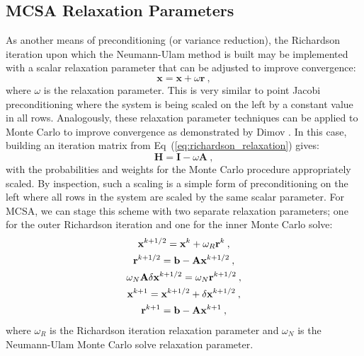 \clearpage

\subsection{MCSA Relaxation Parameters}
\label{subsec:spn_mcsa_relaxation}
As another means of preconditioning (or variance reduction), the
Richardson iteration upon which the Neumann-Ulam method is built may
be implemented with a scalar relaxation parameter that can be adjusted
to improve convergence:
\begin{equation}
  \mathbf{x} = \mathbf{x} + \omega \mathbf{r}\:,
  \label{eq:richardson_relaxation}
\end{equation}
where $\omega$ is the relaxation parameter. This is very similar to
point Jacobi preconditioning where the system is being scaled on the
left by a constant value in all rows. Analogously, these relaxation
parameter techniques can be applied to Monte Carlo to improve
convergence as demonstrated by Dimov \cite{dimov_new_1998}. In this
case, building an iteration matrix from
Eq~(\ref{eq:richardson_relaxation}) gives:
\begin{equation}
  \mathbf{H} = \mathbf{I} - \omega \mathbf{A}\:,
  \label{eq:relaxed_iteration_matrix}
\end{equation}
with the probabilities and weights for the Monte Carlo procedure
appropriately scaled. By inspection, such a scaling is a simple form
of preconditioning on the left where all rows in the system are scaled
by the same scalar parameter. For MCSA, we can stage this scheme with
two separate relaxation parameters; one for the outer Richardson
iteration and one for the inner Monte Carlo solve:
\begin{subequations}
  \begin{gather}
    \mathbf{x}^{k+1/2} = \mathbf{x}^k + \omega_R \mathbf{r}^k\:,\\ \mathbf{r}^{k+1/2}
    = \mathbf{b} -
    \mathbf{A}\mathbf{x}^{k+1/2}\:,\\ \omega_N\mathbf{A}\delta\mathbf{x}^{k+1/2} =
    \omega_N\mathbf{r}^{k+1/2}\:,\\ \mathbf{x}^{k+1} = \mathbf{x}^{k+1/2} + \delta
    \mathbf{x}^{k+1/2}\:,\\ \mathbf{r}^{k+1} = \mathbf{b} - \mathbf{A}\mathbf{x}^{k+1}\:,
  \end{gather}
  \label{eq:mcsa_relaxed}
\end{subequations}
where $\omega_R$ is the Richardson iteration relaxation parameter and
$\omega_N$ is the Neumann-Ulam Monte Carlo solve relaxation parameter.

